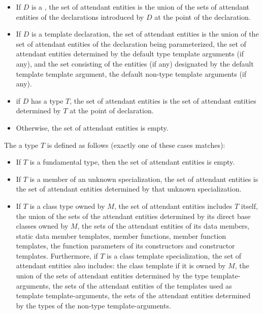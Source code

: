 \begin{std.txt}
\begin{itemize}
    \item If $D$ is a , the set of attendant entities
    is the union of the sets of attendant entities of the declarations introduced by
    $D$ at the point of the declaration.

    \item If $D$ is a template declaration, the set of attendant entities is 
    the union of the set of attendant entities 
    of the declaration being parameterized, the set of attendant entities
    determined by the default type template arguments (if any), 
    and the set consisting of 
    the entities (if any) designated by the default template template argument,
    the default non-type template arguments (if any).

    \item if $D$ has a type $T$, the set of attendant entities is the set of 
    attendant entities determined by $T$ at the point of declaration.

    \item Otherwise, the set of attendant entities is empty.
  \end{itemize}

  The  a type $T$ is defined as follows
  (exactly one of these cases matches):
  \begin{itemize}
    \item If $T$ is a fundamental type, then
    the set of attendant entities is empty.

    \item If $T$ is a member of an unknown specialization, the set of
    attendant entities is the set of attendant entities determined by that
    unknown specialization.

    \item If $T$ is a class type owned by $M$, the set of attendant entities includes
    $T$ itself, the union of the sets of the attendant entities determined
    by its direct base classes owned by $M$, the sets of the
    attendant entities of its data members, static data member templates,
    member functions, member function templates, 
    the function parameters of its constructors and constructor templates.  
    Furthermore, if $T$ is a 
    class template specialization, the set of attendant entities also 
    includes: the class template if it is owned by $M$,
    the union of the sets of attendant entities determined by the type
    template-arguments, the sets of the attendant entities of the templates
    used as template template-arguments, the sets of the attendant entities
    determined by the types of the non-type template-arguments.


\end{itemize}
\end{std.txt}
